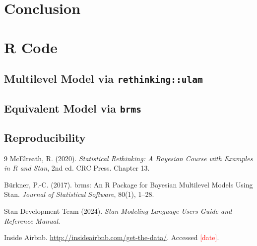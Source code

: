 \documentclass[11pt,a4paper]{article}
\begin{document}
\section{Conclusion}\label{sec:conclusion}

\appendix
\section{R Code}

\subsection{Multilevel Model via \texttt{rethinking::ulam}}


\subsection{Equivalent Model via \texttt{brms}}


\subsection{Reproducibility}

\begin{thebibliography}{9}
McElreath, R. (2020). \emph{Statistical Rethinking: A Bayesian Course with
Examples in R and Stan}, 2nd ed. CRC Press. Chapter 13.

B\"urkner, P.-C. (2017). brms: An R Package for Bayesian Multilevel Models Using
Stan. \emph{Journal of Statistical Software}, 80(1), 1--28.

Stan Development Team (2024). \emph{Stan Modeling Language Users Guide and
Reference Manual}.

Inside Airbnb. \url{http://insideairbnb.com/get-the-data/}. Accessed
\textcolor{red}{[date]}.
\end{thebibliography}
\end{document}
